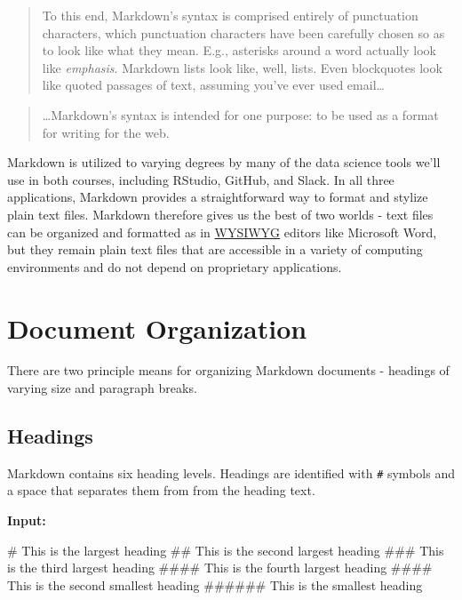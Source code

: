 \documentclass[]{book}
\newenvironment{Shaded}{\begin{snugshade}}{\end{snugshade}}
\newcommand{\FunctionTok}[1]{\textcolor[rgb]{0.00,0.00,0.00}{#1}}
\theoremstyle{definition}
\theoremstyle{definition}
\theoremstyle{definition}
\theoremstyle{remark}
\begin{document}
\begin{quote}
To this end, Markdown's syntax is comprised entirely of punctuation
characters, which punctuation characters have been carefully chosen so
as to look like what they mean. E.g., asterisks around a word actually
look like \emph{emphasis}. Markdown lists look like, well, lists. Even
blockquotes look like quoted passages of text, assuming you've ever used
email\ldots{}
\end{quote}

\begin{quote}
\ldots{}Markdown's syntax is intended for one purpose: to be used as a
format for writing for the web.
\end{quote}

Markdown is utilized to varying degrees by many of the data science
tools we'll use in both courses, including RStudio, GitHub, and Slack.
In all three applications, Markdown provides a straightforward way to
format and stylize plain text files. Markdown therefore gives us the
best of two worlds - text files can be organized and formatted as in
\href{https://en.wikipedia.org/wiki/WYSIWYG}{WYSIWYG} editors like
Microsoft Word, but they remain plain text files that are accessible in
a variety of computing environments and do not depend on proprietary
applications.

\section{Document Organization}\label{document-organization}

There are two principle means for organizing Markdown documents -
headings of varying size and paragraph breaks.

\subsection{Headings}\label{headings}

Markdown contains six heading levels. Headings are identified with
\texttt{\#} symbols and a space that separates them from from the
heading text.

\textbf{Input:}

\begin{Shaded}
\begin{Highlighting}[]
\FunctionTok{# This is the largest heading}
\FunctionTok{## This is the second largest heading}
\FunctionTok{### This is the third largest heading}
\FunctionTok{#### This is the fourth largest heading}
\FunctionTok{#### This is the second smallest heading}
\FunctionTok{###### This is the smallest heading}
\end{Highlighting}
\end{Shaded}
\end{document}
